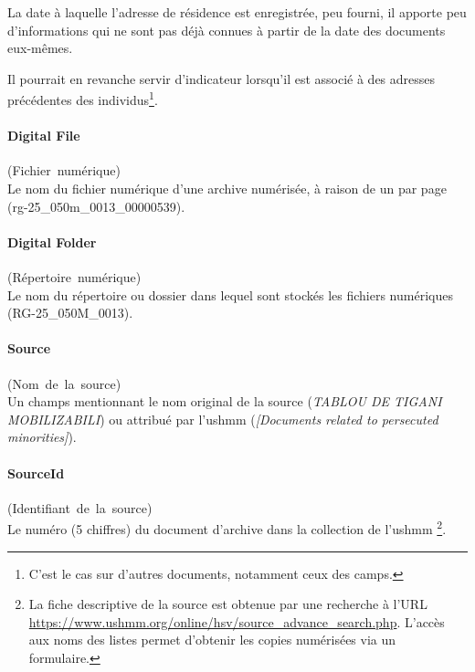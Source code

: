\documentclass[a4paper,12pt,twoside]{book}
\begin{document}
                La date à laquelle l'adresse de résidence est enregistrée, peu fourni, il apporte peu d'informations qui ne sont pas déjà connues à partir de la date des documents eux-mêmes.
                
                Il pourrait en revanche servir d'indicateur lorsqu'il est associé à des adresses précédentes des individus\footnote{C'est le cas sur d'autres documents, notamment ceux des camps.}.

                \paragraph{Digital File}\mbox{(Fichier numérique)} \\
                
                Le nom du fichier numérique d'une archive numérisée, à raison de un par page (\og{}rg-25\_050m\_0013\_00000539\fg{}).
                
                \paragraph{Digital Folder}\mbox{(Répertoire numérique)} \\
                
                Le nom du répertoire ou dossier dans lequel sont stockés les fichiers numériques (\og{}RG-25\_050M\_0013\fg{}).
                
                \paragraph{Source}\mbox{(Nom de la source)} \\
                
                Un champs mentionnant le nom original de la source (\textit{TABLOU DE TIGANI MOBILIZABILI}) ou attribué par l'\gls{ushmm} (\textit{[Documents related to persecuted minorities]}).

                \paragraph{SourceId}\mbox{(Identifiant de la source)} \\
                
                Le numéro (5 chiffres) du document d'archive dans la collection de l'\gls{ushmm}
                \footnote{La fiche descriptive de la source est obtenue par une recherche à l'URL  \url{https://www.ushmm.org/online/hsv/source_advance_search.php}. L'accès aux noms des listes permet d'obtenir les copies numérisées via un formulaire.}.
                \pagebreak
                
\end{document}
